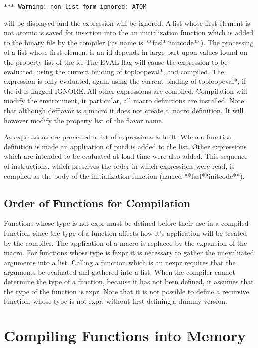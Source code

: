 \begin{verbatim}
*** Warning: non-list form ignored: ATOM
\end{verbatim}
will  be  displayed  and  the expression will be ignored. A list
whose first element is not atomic is saved  for  insertion  into
the an initialization function which is added to the binary file
by   the   compiler  (its  name  is  **fasl**initcode**).    The
processing of a list whose first element is  an  id  depends  in
large part upon values found on the property list of the id. The
EVAL  flag  will cause the expression to be evaluated, using the
current binding of toploopeval*, and compiled. The expression is
only evaluated, again using the current binding of toploopeval*,
if the id is flagged IGNORE. All other expressions are compiled.
Compilation will modify  the  environment,  in  particular,  all
macro definitions are installed. Note that although defflavor is
a  macro  it does not create a macro definition. It will however
modify the property list of the flavor name.

  As expressions are processed a list of expressions  is  built.
When  a  function  definition  is made an application of putd is
added to the list. Other expressions which are  intended  to  be
evaluated  at  load  time  were  also  added.  This  sequence of
instructions, which preserves the  order  in  which  expressions
were  read,  is  compiled  as  the  body  of  the initialization
function (named **fasl**initcode**).

\subsection{Order of Functions for Compilation}

  Functions whose type is not expr must be defined before  their
use in a compiled function, since the type of a function affects
how  it's  application  will  be  treated  by  the compiler. The
application of a macro is  replaced  by  the  expansion  of  the
macro.  For  functions  whose  type  is fexpr it is necessary to
gather the unevaluated arguments into a list. Calling a function
which is an nexpr requires that the arguments be  evaluated  and
gathered  into  a  list.  When the compiler cannot determine the
type of a function, because it has not been defined, it  assumes
that  the  type  of  the  function  is expr. Note that it is not
possible to define a recursive function, whose type is not expr,
without first defining a dummy version.

\section{Compiling Functions into Memory}

